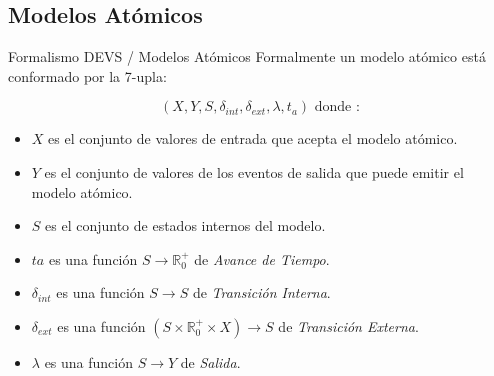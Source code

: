 \documentclass{beamer}
\begin{document}
\subsection{Modelos Atómicos}
\begin{frame}{Formalismo DEVS / Modelos Atómicos}
	Formalmente un modelo atómico está conformado por la 7-upla:

	\begin{equation} 
	(X, Y, S, \delta_{int} , \delta_{ext}, \lambda, t_{a}) \mbox{ donde :}
	\end{equation}

	\begin{itemize}
	\item<1-> $X$ es el conjunto de valores de entrada que acepta el modelo atómico.
	\item<2-> $Y$ es el conjunto de valores de los eventos de salida que puede emitir el modelo atómico.
	\item<3-> $S$ es el conjunto de estados internos del modelo.
	\item<4-> $ta$ es una función $S \to \mathbb{R}^{+}_{0}$ de \emph{Avance de Tiempo}.
	\item<5-> $\delta_{int}$ es una función $S \to S$ de \emph{Transición Interna}.
	\item<6-> $\delta_{ext}$ es una función $(S \times \mathbb{R}^{+}_{0} \times X) \to S$ de \emph{Transición Externa}.
	\item<7-> $\lambda$ es una función $S \to Y$ de \emph{Salida}.
	\end{itemize}
\end{frame}

\end{document}
